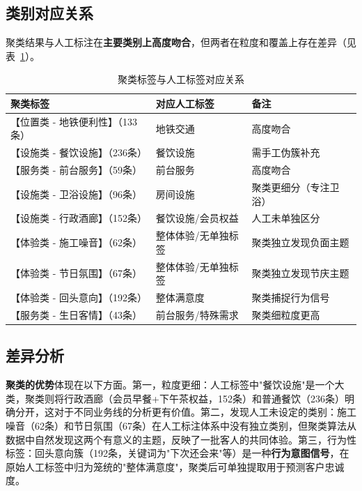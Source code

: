 \documentclass[11pt, a4paper]{article}
\begin{document}
\subsection{类别对应关系}

聚类结果与人工标注在\textbf{主要类别上高度吻合}，但两者在粒度和覆盖上存在差异（见表~\ref{tab:cluster-compare}）。

\begin{table}[H]
\centering
\caption{聚类标签与人工标签对应关系}
\label{tab:cluster-compare}
\setlength{\tabcolsep}{5pt}
\begin{tabular}{lll}
\toprule
\textbf{聚类标签} & \textbf{对应人工标签} & \textbf{备注} \\
\midrule
【位置类 - 地铁便利性】（133条） & 地铁交通 & 高度吻合 \\
【设施类 - 餐饮设施】（236条） & 餐饮设施 & 需手工伪簇补充 \\
【服务类 - 前台服务】（59条） & 前台服务 & 高度吻合 \\
【设施类 - 卫浴设施】（96条） & 房间设施 & 聚类更细分（专注卫浴） \\
【设施类 - 行政酒廊】（152条） & 餐饮设施/会员权益 & 人工未单独区分 \\
【体验类 - 施工噪音】（62条） & 整体体验/无单独标签 & 聚类独立发现负面主题 \\
【体验类 - 节日氛围】（67条） & 整体体验/无单独标签 & 聚类独立发现节庆主题 \\
【体验类 - 回头意向】（192条） & 整体满意度 & 聚类捕捉行为信号 \\
【服务类 - 生日客情】（43条）  & 前台服务/特殊需求 & 聚类细粒度更高 \\
\bottomrule
\end{tabular}
\end{table}

\subsection{差异分析}

\textbf{聚类的优势}体现在以下方面。第一，粒度更细：人工标签中"餐饮设施"是一个大类，聚类则将行政酒廊（会员早餐+下午茶权益，152条）和普通餐饮（236条）明确分开，这对于不同业务线的分析更有价值。第二，发现人工未设定的类别：施工噪音（62条）和节日氛围（67条）在人工标注体系中没有独立类别，但聚类算法从数据中自然发现这两个有意义的主题，反映了一批客人的共同体验。第三，行为性标签：回头意向簇（192条，关键词为"下次还会来"等）是一种\textbf{行为意图信号}，在原始人工标签中归为笼统的"整体满意度"，聚类后可单独提取用于预测客户忠诚度。
\end{document}

